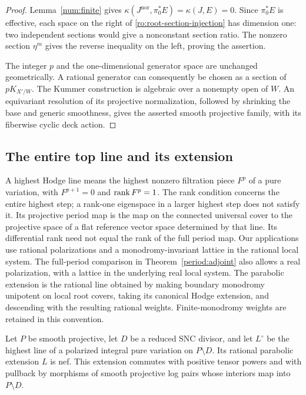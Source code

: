 \begin{proof}
Lemma~\ref{num:finite} gives
$\kappa(J^{\mathrm{nor}},\pi_0^*E)=\kappa(J,E)=0$.
Since $\pi_0^*E$ is effective, each space on the right of
\eqref{ro:root-section-injection} has dimension one: two independent
sections would give a nonconstant section ratio. The nonzero section
$\eta^m$ gives the reverse inequality on the left, proving the assertion.

The integer $p$ and the one-dimensional generator space are unchanged
geometrically.  A rational generator can consequently be chosen as a
section of $pK_{X'/W}$.  The Kummer construction is algebraic over a
nonempty open of $W$.  An equivariant resolution of its projective
normalization, followed by shrinking the base and generic smoothness,
gives the asserted smooth projective family, with its fiberwise cyclic
deck action.
\end{proof}


\subsection{The entire top line and its extension}

A highest Hodge line means the
highest nonzero filtration piece $F^p$ of a pure variation, with
$F^{p+1}=0$ and $\operatorname{rank} F^p=1$. The rank condition concerns the entire
highest step; a rank-one eigenspace in a larger highest step does not
satisfy it. Its projective period map is the map on the connected universal cover
to the projective space of a flat reference vector space determined
by that line.
Its differential rank need not equal the rank of the full period map.
Our applications use rational polarizations and a monodromy-invariant
lattice in the rational local system. The full-period comparison in Theorem~\ref{period:adjoint} also
allows a real polarization, with a lattice in the underlying real local
system. The parabolic extension is the rational line obtained by making
boundary monodromy unipotent on local root covers, taking its canonical
Hodge extension, and descending with the resulting rational weights.
Finite-monodromy weights are retained in this convention.

\begin{lemma}\label{hodge:extensions}
Let $P$ be smooth projective, let $D$ be a reduced SNC divisor, and let
$L^\circ$ be the highest line of a polarized integral pure variation
on $P\setminus D$. Its rational parabolic extension $L$ is nef.
This extension commutes with positive tensor powers and with pullback
by morphisms of smooth projective log pairs whose interiors map into
$P\setminus D$.
\end{lemma}

